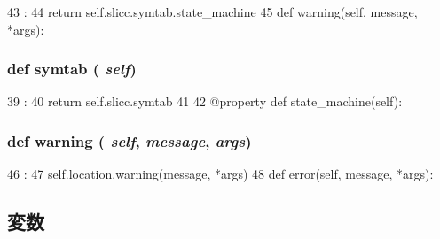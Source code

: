 \begin{DoxyCode}
43                            :
44         return self.slicc.symtab.state_machine
45 
    def warning(self, message, *args):
\end{DoxyCode}
\hypertarget{classslicc_1_1ast_1_1AST_1_1AST_a2e24520edc67d58047aa1afbee945477}{
\subsubsection[{symtab}]{\setlength{\rightskip}{0pt plus 5cm}def symtab ( {\em self})}}
\label{classslicc_1_1ast_1_1AST_1_1AST_a2e24520edc67d58047aa1afbee945477}



\begin{DoxyCode}
39                     :
40         return self.slicc.symtab
41 
42     @property
    def state_machine(self):
\end{DoxyCode}
\hypertarget{classslicc_1_1ast_1_1AST_1_1AST_ac1fc7cd7c75bbbeb7fcd0ada8bf86b81}{
\subsubsection[{warning}]{\setlength{\rightskip}{0pt plus 5cm}def warning ( {\em self}, \/   {\em message}, \/   {\em args})}}
\label{classslicc_1_1ast_1_1AST_1_1AST_ac1fc7cd7c75bbbeb7fcd0ada8bf86b81}



\begin{DoxyCode}
46                                      :
47         self.location.warning(message, *args)
48 
    def error(self, message, *args):
\end{DoxyCode}


\subsection{変数}
\hypertarget{classslicc_1_1ast_1_1AST_1_1AST_a5f269c22e6d9d32b0b0ad7e6166854df}{
\subsubsection[{location}]{}}
\label{classslicc_1_1ast_1_1AST_1_1AST_a5f269c22e6d9d32b0b0ad7e6166854df}
\hypertarget{classslicc_1_1ast_1_1AST_1_1AST_a8b16b1e1994f9c318702b801bd3b8420}{
\subsubsection[{pairs}]{}}
\label{classslicc_1_1ast_1_1AST_1_1AST_a8b16b1e1994f9c318702b801bd3b8420}



